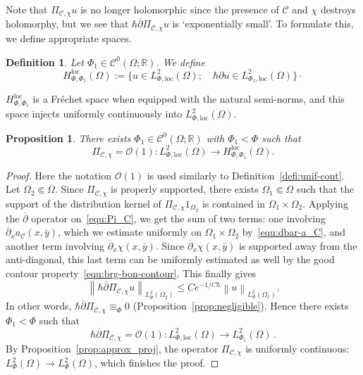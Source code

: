 \documentclass{article}
\newtheorem{prop}[theo]{Proposition}
\newtheorem{defi}[theo]{Definition}
\newcommand{\loc}{\mathrm{loc}}
\newcommand{\norm}[1]{\left\|#1\right\|}
\newcommand{\lphi}{L^2_\Phi}
\newcommand{\dbar}{\overline\partial}
\newcommand{\RM}{\mathbb{R}}
\renewcommand{\O}{\mathcal{O}}
\newcommand{\h}{\hbar}
\begin{document}
Note that $\Pi_{\mathcal{C}, \chi} u $ is no longer holomorphic since
the presence of $\mathcal{C}$ and $\chi$ destroys holomorphy, but we
see that $\h\dbar\Pi_{\mathcal{C}, \chi} u$ is `exponentially
small'. To formulate this, we define appropriate spaces.

\begin{defi}
  Let $\Phi_1\in\mathscr{C}^0(\Omega;\RM)$. We define
  \begin{equation}
    H^\loc_{\Phi,\Phi_1}(\Omega) := \{u\in L^2_{\Phi,\loc}(\Omega); 
    \quad \h\partial u \in L^ 2_{\Phi_1,\loc}(\Omega)\}\cdot     
  \end{equation}
\end{defi}
$H^\loc_{\Phi,\Phi_1}$ is a Fréchet space when equipped with the
natural semi-norms, and this space injects uniformly continuously into
$L^2_{\Phi,\loc}(\Omega)$.
\begin{prop}
  \label{prop:pi_chi-holom}
  There exists $\Phi_1\in\mathscr{C}^0(\Omega;\RM)$ with $\Phi_1<\Phi$
  such that
  \[
  \Pi_{\mathcal{C}, \chi} = \mathcal{O}(1): L_{ \Phi,\loc}^{2}(\Omega)
  \to H^\loc_{\Phi,\Phi_1}(\Omega).
  \]
\end{prop}
\begin{proof}
  Here the notation $\O(1)$ is used similarly to
  Definition~\ref{defi:unif-cont}.  Let $\Omega_2\Subset\Omega$. Since
  $\Pi_{\mathcal{C}, \chi}$ is properly supported, there exists
  $\Omega_1\Subset\Omega$ such that the support of the distribution
  kernel of $\Pi_{\mathcal{C}, \chi} 1_{\Omega_2}$ is contained in
  $\Omega_1\times \Omega_2$. Applying the $\dbar$ operator
  on~\eqref{equ:Pi_C}, we get the sum of two terms: one involving
  $\dbar_x a_{\mathcal{C}}(x,\bar y)$, which we estimate uniformly on
  $\Omega_1\times \Omega_2$ by~\eqref{equ:dbar-a_C}, and another term
  involving $\dbar_x \chi(x,\bar y)$. Since $\dbar_x \chi(x,\bar y)$
  is supported away from the anti-diagonal, this last term can be
  uniformly estimated as well by the good contour
  property~\eqref{equ:brg-bon-contour}. This finally gives
  \[
  \norm{\h\dbar \Pi_{\mathcal{C}, \chi} u}_{\lphi(\Omega_2)} \leq
  Ce^{-1/C\h} \norm{u}_{\lphi(\Omega_1)}.
  \]
  In other words, $\h\dbar \Pi_{\mathcal{C}, \chi} \equiv_\Phi 0$
  (Proposition~\ref{prop:negligible}). Hence there exists
  $\Phi_1<\Phi$ such that
  \[
  \h\dbar \Pi_{\mathcal{C}, \chi} = \mathcal{O}(1): L_{
    \Phi,\loc}^{2}(\Omega) \to L^2_{\Phi_1}(\Omega)\,.
  \]
  By Proposition~\ref{prop:approx_proj}, the operator
  $\Pi_{\mathcal{C}, \chi}$ is uniformly continuous:
  $\lphi(\Omega)\to \lphi(\Omega)$, which finishes the proof.
\end{proof}
\end{document}
